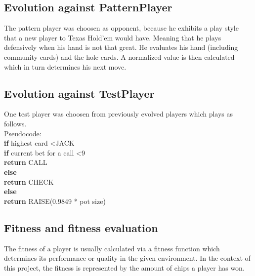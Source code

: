 \documentclass[12pt,fleqn,a4paper]{article}
\begin{document}
\subsection{Evolution against PatternPlayer}
\label{ssec:patternplayer}
The pattern player was choosen as opponent, because he exhibits a play style that a new player to Texas Hold'em would have. Meaning that he plays defensively when his hand is not that great. He evaluates his hand (including community cards) and the hole cards. A normalized value is then calculated which in turn determines his next move.

\newpage

\subsection{Evolution against TestPlayer}
\label{ssec:testplayer}
One test player was choosen from previously evolved players which plays as follows.\\

\underline{Pseudocode:}\\

\textbf{if} highest card \textless \hspace*{0.5em}JACK \\
\hspace*{3em}\textbf{if} current bet for a call \textless \hspace*{0.5em}9 \\
\hspace*{3.9em} \textbf{return} CALL \\
\hspace*{2.5em} \textbf{else} \\
\hspace*{3.9em} \textbf{return} CHECK \\
\hspace*{1.5em} \textbf{else}  \\
\hspace*{3em} \textbf{return} RAISE(0.9849 * pot size) \\

\subsection{Fitness and fitness evaluation}
\label{fitness}
The fitness of a player is usually calculated via a fitness function which determines its performance or quality in the given environment. In the context of this project, the fitness is represented by the amount of chips a player has won.
\end{document}
